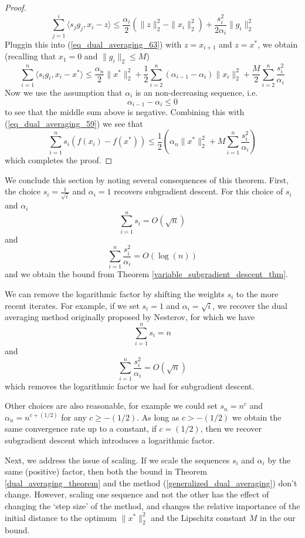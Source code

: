 \begin{proof}
\begin{equation}
  \sum_{j = 1}^i\langle s_jg_j, x_i - z\rangle \leq \frac{\alpha_i}{2}(\|z\|_2^2 - \|x_i\|_2^2) + \frac{s_i^2}{2\alpha_i}\|g_i\|_2^2
 \end{equation}
 Pluggin this into (\ref{eq_dual_averaging_63}) with $z = x_{i+1}$ and $z = x^*$, we obtain (recalling that $x_1 = 0$ and
 $\|g_i\|_2 \leq M$)
 \begin{equation}
  \displaystyle\sum_{i = 1}^n \langle s_ig_i, x_i - x^*\rangle \leq \frac{\alpha_n}{2}\|x^*\|_2^2 
  + \frac{1}{2}\displaystyle\sum_{i = 2}^n (\alpha_{i-1} - \alpha_i)\|x_i\|_2^2 + \frac{M}{2}\displaystyle\sum_{i = 2}^n \frac{s_i^2}{\alpha_i}
 \end{equation}
 Now we use the assumption that $\alpha_i$ is an non-decreasing sequence, i.e. $$\alpha_{i-1} - \alpha_i \leq 0$$ to see that
 the middle sum above is negative. Combining this with (\ref{eq_dual_averaging_59}) we see that
 \begin{equation}
  \displaystyle\sum_{i = 1}^n s_i(f(x_i) - f(x^*)) \leq \frac{1}{2}\left(\alpha_n\|x^*\|_2^2 + M\displaystyle\sum_{i = 1}^n \frac{s_i^2}{\alpha_i}\right)
 \end{equation}
 which completes the proof.

\end{proof}

We conclude this section by noting several consequences of this theorem. First, the choice $s_i = \frac{1}{\sqrt{i}}$
and $\alpha_i = 1$ recovers subgradient descent. For this choice of $s_i$ and $\alpha_i$
$$\displaystyle\sum_{i = 1}^n s_i = O(\sqrt{n})
$$
and
$$\displaystyle\sum_{i = 1}^n \frac{s_i^2}{\alpha_i} = O(\log(n))
$$
and we obtain the bound from Theorem \ref{variable_subgradient_descent_thm}. 

We can remove the logarithmic factor by
shifting the weights $s_i$ to the more recent iterates. For example, if we set $s_i = 1$ and $\alpha_i = \sqrt{i}$,
we recover the dual averaging method originally proposed by Nesterov, for which we have
$$\displaystyle\sum_{i = 1}^n s_i = n
$$
and
$$\displaystyle\sum_{i = 1}^n \frac{s_i^2}{\alpha_i} = O(\sqrt{n})
$$
which removes the logarithmic factor we had for subgradient descent. 

Other choices are also reasonable, for example we could
set $s_n = n^c$ and $\alpha_n = n^{c + (1/2)}$ for any $c \geq -(1/2)$. As long as $c > -(1/2)$ we obtain the same convergence
rate up to a constant, if $c = (1/2)$, then we recover subgradient descent which introduces a logarithmic factor.

Next, we address the issue of scaling. If we scale the sequences $s_i$ and $\alpha_i$ by the same (positive) factor,
then both the bound in Theorem \ref{dual_averaging_theorem} and the method (\ref{generalized_dual_averaging}) don't change.
However, scaling one sequence and not the other has the effect of changing the `step size' of the method, and 
changes the relative importance of the initial distance to the optimum $\|x^*\|_2^2$ and the Lipschitz constant $M$ in the
our bound.

